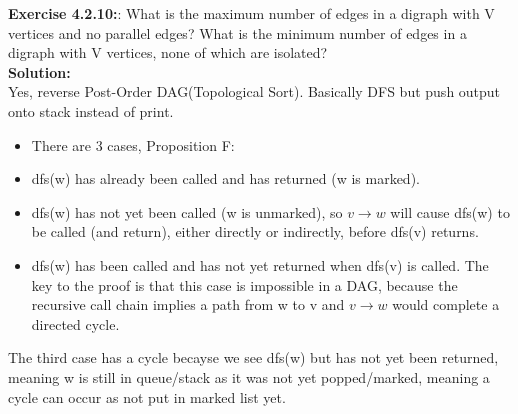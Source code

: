 \documentclass[11pt,fleqn]{article}
\begin{document}
\textbf{Exercise 4.2.10:}: What is the maximum number of edges in a digraph with V vertices and no parallel
edges? What is the minimum number of edges in a digraph with V vertices, none of
which are isolated?\\

\textbf{Solution:}\\
Yes, reverse Post-Order DAG(Topological Sort). Basically DFS but push output onto stack instead of print.

\begin{itemize}
	\item There are 3 cases, Proposition F:
	\item dfs(w) has already been called and has returned (w is marked).
	\item dfs(w) has not yet been called (w is unmarked), so $v\rightarrow w$ will cause dfs(w) to
be called (and return), either directly or indirectly, before dfs(v) returns.
	\item dfs(w) has been called and has not yet returned when dfs(v) is called. The
key to the proof is that this case is impossible in a DAG, because the recursive
call chain implies a path from w to v and $v \rightarrow w$ would complete a directed
cycle.
\end{itemize}

The third case has a cycle becayse we see dfs(w) but has not yet been returned, meaning w is still in queue/stack as it was not yet popped/marked, meaning a cycle can occur as not put in marked list yet.

	
\end{document}

